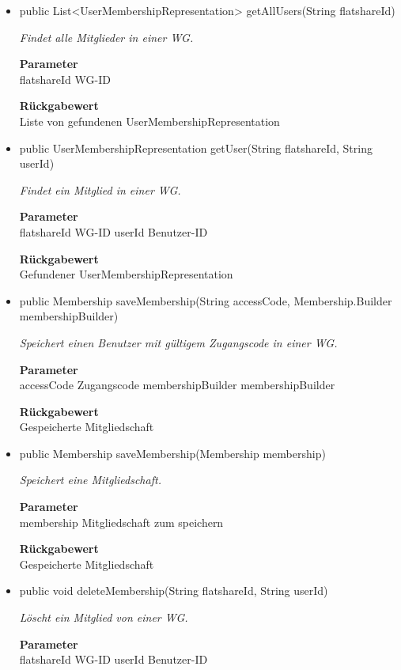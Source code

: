 \documentclass[a4paper]{scrreprt}
\begin{document}
    \begin{itemize}
    	\item{public List<UserMembershipRepresentation> getAllUsers(String flatshareId)}
    	
    	\textit{Findet alle Mitglieder in einer WG.}
    	
    	\textbf{Parameter} \\
    	flatshareId WG-ID
    	
    	\textbf{Rückgabewert} \\
    	Liste von gefundenen UserMembershipRepresentation        \item{public UserMembershipRepresentation getUser(String flatshareId, String userId)}
    	
    	\textit{Findet ein Mitglied in einer WG.}
    	
    	\textbf{Parameter} \\
    	flatshareId WG-ID
    	userId Benutzer-ID
    	
    	\textbf{Rückgabewert} \\
    	Gefundener UserMembershipRepresentation        \item{public Membership saveMembership(String accessCode, Membership.Builder membershipBuilder)}
    	
    	\textit{Speichert einen Benutzer mit gültigem Zugangscode in einer WG.}
    	
    	\textbf{Parameter} \\
    	accessCode Zugangscode
    	membershipBuilder membershipBuilder
    	
    	\textbf{Rückgabewert} \\
    	Gespeicherte Mitgliedschaft        \item{public Membership saveMembership(Membership membership)}
    	
    	\textit{Speichert eine Mitgliedschaft.}
    	
    	\textbf{Parameter} \\
    	membership Mitgliedschaft zum speichern
    	
    	\textbf{Rückgabewert} \\
    	Gespeicherte Mitgliedschaft        \item{public void deleteMembership(String flatshareId, String userId)}
    	
    	\textit{Löscht ein Mitglied von einer WG.}
    	
    	\textbf{Parameter} \\
    	flatshareId WG-ID
    	userId Benutzer-ID
    	
    	
    \end{itemize}
\end{document}
